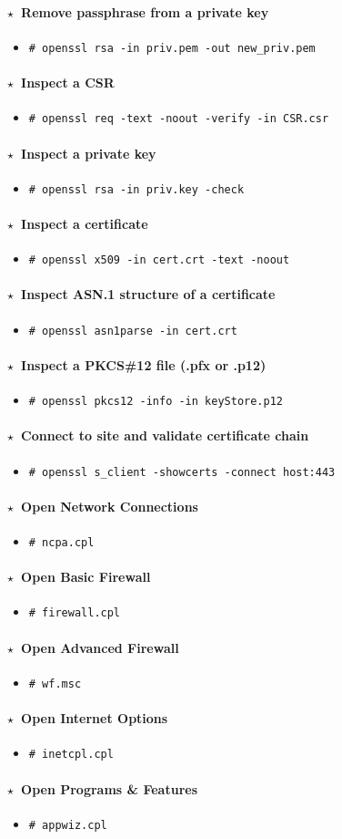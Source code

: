 \documentclass[10pt,landscape]{article}
\newcommand{\os}[1]{\texttt{\footnotesize{#1}}}
\newcommand{\unix}{\os{U}}
\newcommand{\windows}{\os{W}}
\newenvironment{action}[1]
  {\paragraph{$\star$~#1}\begin{itemize}[leftmargin=1cm]}
  {\end{itemize}}
\newcommand{\cmd}[2]{\item[#1] {\small\tt\# #2}}
\begin{document}
\begin{multicols*}{3}
\begin{action}{Remove passphrase from a private key}
    \cmd{\unix}{openssl rsa -in priv.pem -out new\_priv.pem}
\end{action}

\begin{action}{Inspect a CSR}
    \cmd{\unix}{openssl req -text -noout -verify -in CSR.csr}
\end{action}

\begin{action}{Inspect a private key}
    \cmd{\unix}{openssl rsa -in priv.key -check}
\end{action}

\begin{action}{Inspect a certificate}
    \cmd{\unix}{openssl x509 -in cert.crt -text -noout}
\end{action}

\begin{action}{Inspect ASN.1 structure of a certificate}
    \cmd{\unix}{openssl asn1parse -in cert.crt}
\end{action}

\begin{action}{Inspect a PKCS\#12 file (.pfx or .p12)}
    \cmd{\unix}{openssl pkcs12 -info -in keyStore.p12}
\end{action}

\begin{action}{Connect to site and validate certificate chain}
    \cmd{\unix}{openssl s\_client -showcerts -connect host:443}
\end{action}

\begin{action}{Open Network Connections}
\cmd{\windows}{ncpa.cpl}
\end{action}

\begin{action}{Open Basic Firewall}
\cmd{\windows}{firewall.cpl}
\end{action}

\begin{action}{Open Advanced Firewall}
\cmd{\windows}{wf.msc}
\end{action}

\begin{action}{Open Internet Options}
\cmd{\windows}{inetcpl.cpl}
\end{action}

\begin{action}{Open Programs \& Features}
\cmd{\windows}{appwiz.cpl}
\end{action}


\end{multicols*}
\end{document}
